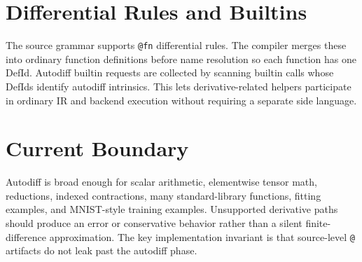 \section{Differential Rules and Builtins}

The source grammar supports \texttt{@fn} differential rules. The compiler merges
these into ordinary function definitions before name resolution so each function
has one DefId. Autodiff builtin requests are collected by scanning builtin calls
whose DefIds identify autodiff intrinsics. This lets derivative-related helpers
participate in ordinary IR and backend execution without requiring a separate
side language.

\section{Current Boundary}

Autodiff is broad enough for scalar arithmetic, elementwise tensor math,
reductions, indexed contractions, many standard-library functions, fitting
examples, and MNIST-style training examples. Unsupported derivative paths should
produce an error or conservative behavior rather than a silent finite-difference
approximation. The key implementation invariant is that source-level
\texttt{@} artifacts do not leak past the autodiff phase.
